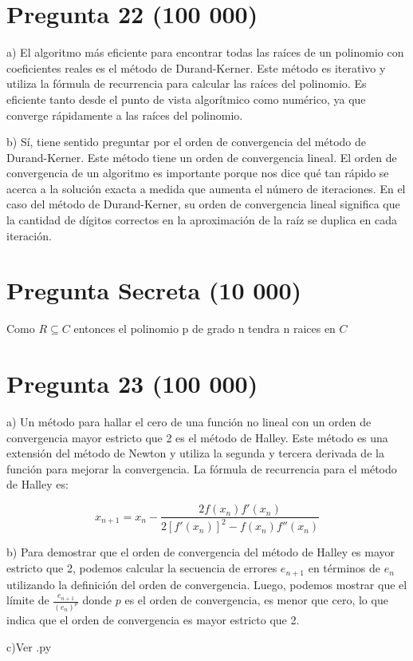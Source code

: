 \documentclass[a4paper,12pt]{article}
\begin{document}
\section*{Pregunta 22 (100 000)}
a) El algoritmo más eficiente para encontrar todas las raíces de un polinomio con coeficientes reales es el método de Durand-Kerner. Este método es iterativo y utiliza la fórmula de recurrencia para calcular las raíces del polinomio. Es eficiente tanto desde el punto de vista algorítmico como numérico, ya que converge rápidamente a las raíces del polinomio.

b) Sí, tiene sentido preguntar por el orden de convergencia del método de Durand-Kerner. Este método tiene un orden de convergencia lineal. El orden de convergencia de un algoritmo es importante porque nos dice qué tan rápido se acerca a la solución exacta a medida que aumenta el número de iteraciones. En el caso del método de Durand-Kerner, su orden de convergencia lineal significa que la cantidad de dígitos correctos en la aproximación de la raíz se duplica en cada iteración.


\section*{Pregunta Secreta (10 000)}
Como $R \subseteq C$ entonces el polinomio p de grado n tendra n raices en $C$


\section*{Pregunta 23 (100 000)}
a) Un método para hallar el cero de una función no lineal con un orden de convergencia mayor estricto que 2 es el método de Halley. Este método es una extensión del método de Newton y utiliza la segunda y tercera derivada de la función para mejorar la convergencia. La fórmula de recurrencia para el método de Halley es:

\[ x_{n+1} = x_n - \frac{2f(x_n)f'(x_n)}{2[f'(x_n)]^2 - f(x_n)f''(x_n)} \]

b) Para demostrar que el orden de convergencia del método de Halley es mayor estricto que 2, podemos calcular la secuencia de errores \( e_{n+1} \) en términos de \( e_n \) utilizando la definición del orden de convergencia. Luego, podemos mostrar que el límite de \( \frac{e_{n+1}}{(e_n)^p} \) donde \( p \) es el orden de convergencia, es menor que cero, lo que indica que el orden de convergencia es mayor estricto que 2.

c)Ver .py
\end{document}
